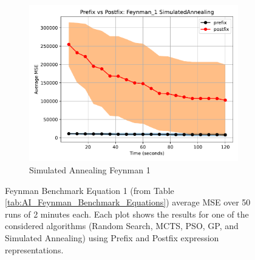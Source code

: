 \documentclass[runningheads]{llncs}
\begin{document}
\begin{figure}
    \vspace{0.5cm}
    
    \begin{subfigure}[b]{0.4\textwidth}
        \includegraphics[width=\linewidth, keepaspectratio]{AIFeynman_Benchmarks/PrePostFeynman_1SimulatedAnnealing.pdf}
        \caption{Simulated Annealing Feynman 1}
        \label{subfig:feynman_1_SA}
    \end{subfigure}
    
    \caption{Feynman Benchmark Equation 1 (from Table \ref{tab:AI_Feynman_Benchmark_Equations}) average MSE over 50 runs of 2 minutes each. Each plot shows the results for one of the considered algorithms (Random Search, MCTS, PSO, GP, and Simulated Annealing) using Prefix and Postfix expression representations.}
    \label{fig:AIFeynman_1_Benchmarks}
\end{figure}
\end{document}
